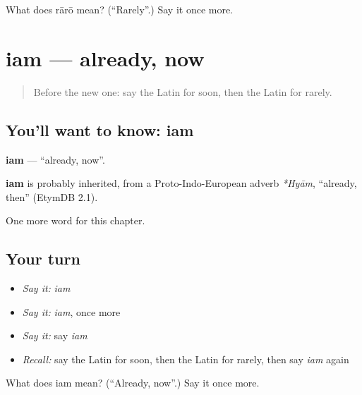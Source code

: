 \begin{tcolorbox}[breakable,colback=teal!4,colframe=teal!35!black,title={Before you move on}]
What does rārō mean? (\textquotedblleft{}Rarely\textquotedblright{}.) Say it once more.
\end{tcolorbox}
\section[iam]{iam — already, now}

\label{lesson:LA-C105-iam}



\begin{quote}
Before the new one: say the Latin for soon, then the Latin for rarely.
\end{quote}

\subsection*{You'll want to know: iam}
\textbf{iam} — \textquotedblleft{}already, now\textquotedblright{}.

\begin{cousinweb}
\textbf{iam} is probably inherited, from a Proto-Indo-European adverb \emph{*Hyām}, \textquotedblleft{}already, then\textquotedblright{} (EtymDB 2.1).
\end{cousinweb}

\begin{grammarlens}[title={What you've built}]
One more word for this chapter.
\end{grammarlens}

\subsection*{Your turn}
\begin{itemize}
\raggedright
  \item \emph{Say it:} \emph{iam}
  \item \emph{Say it:} \emph{iam}, once more
  \item \emph{Say it:} say \emph{iam}
  \item \emph{Recall:} say the Latin for soon, then the Latin for rarely, then say \emph{iam} again
\end{itemize}

\begin{tcolorbox}[breakable,colback=teal!4,colframe=teal!35!black,title={Before you move on}]
What does iam mean? (\textquotedblleft{}Already, now\textquotedblright{}.) Say it once more.
\end{tcolorbox}
